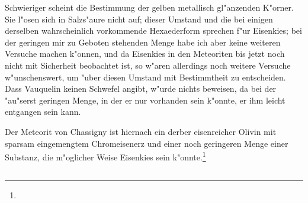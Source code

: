 \documentclass[a4paper, 11pt, oneside]{article}
\begin{document}
Schwieriger scheint die Bestimmung der gelben metallisch gl"anzenden K"orner. Sie l"osen sich in Salzs"aure nicht auf; dieser Umstand und die bei einigen derselben wahrscheinlich vorkommende Hexaederform sprechen f"ur Eisenkies; bei der geringen mir zu Geboten stehenden Menge habe ich aber keine weiteren Versuche machen k"onnen, und da Eisenkies in den Meteoriten bis jetzt noch nicht mit Sicherheit beobachtet ist, so w"aren allerdings noch weitere Versuche w"unschenswert, um "uber diesen Umstand mit Bestimmtheit zu entscheiden. Dass Vauquelin keinen Schwefel angibt, w"urde nichts beweisen, da bei der "au"serst geringen Menge, in der er nur vorhanden sein k"onnte, er ihm leicht entgangen sein kann.

Der Meteorit von Chassigny ist hiernach ein derber eisenreicher Olivin mit sparsam eingemengtem Chromeisenerz und einer noch geringeren Menge einer Substanz, die m"oglicher Weise Eisenkies sein k"onnte.\footnote{}
\subsection{}
\end{document}
